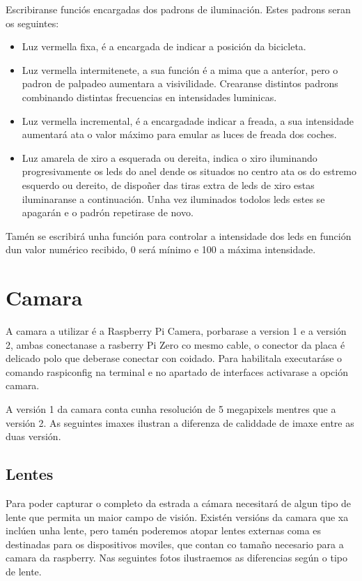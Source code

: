 Escribiranse funciós encargadas dos padrons de iluminación. Estes padrons seran os seguintes:
\begin{itemize}
    \item Luz vermella fixa,
    é a encargada de indicar a posición da bicicleta.
    \item Luz vermella intermitenete,
    a sua función é a mima que a anteríor, pero o padron de palpadeo aumentara a visivilidade. Crearanse distintos padrons combinando distintas frecuencias en intensidades luminicas.
    \item Luz vermella incremental,
    é a encargadade indicar a freada, a sua intensidade aumentará ata o valor máximo para emular as luces de freada dos coches.
    \item Luz amarela de xiro a esquerada ou dereita,
    indica o xiro iluminando progresivamente os leds do anel dende os situados no centro ata os do estremo esquerdo ou dereito, de dispoñer das tiras extra de leds de xiro estas iluminaranse a continuación. Unha vez iluminados todolos leds estes se apagarán e o padrón repetirase de novo.
\end{itemize}

Tamén se escribirá unha función para controlar a intensidade dos leds en función dun valor numérico recibido, 0 será mínimo e 100 a máxima intensidade.

\section{Camara}

A camara a utilizar é a Raspberry Pi Camera, porbarase a version 1 e a versión 2, ambas conectanase a rasberry Pi Zero co mesmo cable, o conector da placa é delicado polo que deberase conectar con coidado. Para habilitala executaráse o comando raspiconfig na terminal e no apartado de interfaces activarase a opción camara.

A versión 1 da camara conta cunha resolución de 5 megapixels mentres que a versión 2. As seguintes imaxes ilustran a diferenza de caliddade de imaxe entre as duas versión.

\subsection{Lentes}
Para poder capturar o completo da estrada a cámara necesitará de algun tipo de lente que permita un maior campo de visión. Existén versións da camara que xa inclúen unha lente, pero tamén poderemos atopar lentes externas coma es destinadas para os dispositivos moviles, que contan co tamaño necesario para a camara da raspberry.
Nas seguintes fotos ilustraemos as diferencias según o tipo de lente.

